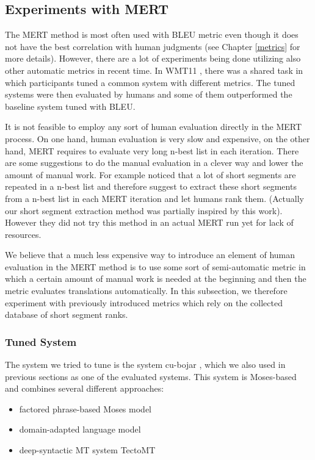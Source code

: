 \subsection{Experiments with MERT}

The MERT method is most often used with BLEU metric even though it does not
have the best correlation with human judgments (see Chapter \ref{metrics}
for more details). However, there are a lot of experiments being done utilizing also
other automatic metrics in recent time. In WMT11 , there was a
shared task in which participants tuned a common system with different metrics.
The tuned systems were then evaluated by humans and some of them outperformed
the baseline system tuned with BLEU.

It is not feasible to employ any sort of human evaluation directly in the MERT
process. On one hand, human evaluation is very slow and expensive, on the
other hand, MERT requires to evaluate very long n-best list in each iteration.
There are some suggestions to do the manual evaluation in a clever way and
lower the amount of manual work. For example 
noticed that a lot of short segments are repeated in a n-best list and therefore
suggest to extract these short segments from a n-best list in each MERT
iteration and let humans rank them. (Actually our short segment extraction
method was partially inspired by this work). However they did not try this
method in an actual MERT run yet for lack of resources. 

We believe that a much less expensive way to introduce an element of human
evaluation in the MERT method is to use some sort of semi-automatic metric in which
a certain amount of manual work is needed at the beginning and then the metric
evaluates translations automatically. In this subsection, we therefore
experiment with previously introduced metrics which rely on the collected
database of short segment ranks.

\subsubsection{Tuned System}

The system we tried to tune is the system cu-bojar ,
which we also used in previous sections as one of the evaluated systems. This
system is Moses-based and combines several different approaches:

\begin{itemize}
  \item factored phrase-based Moses model
  \item domain-adapted language model
  \item deep-syntactic MT system TectoMT
\end{itemize}

